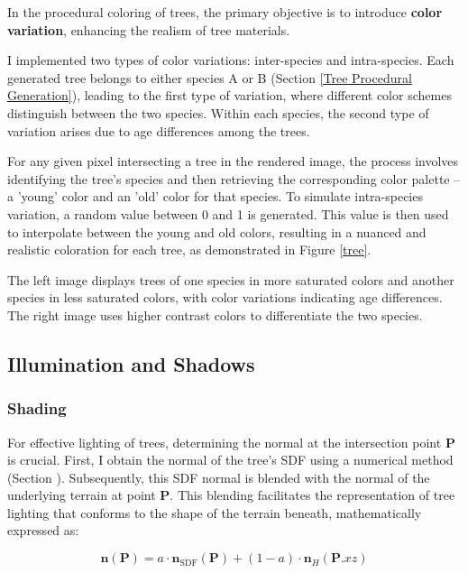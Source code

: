 In the procedural coloring of trees, the primary objective is to introduce \textbf{color variation}, enhancing the realism of tree materials. 

I implemented two types of color variations: inter-species and intra-species. Each generated tree belongs to either species A or B (Section \ref{Tree Procedural Generation}), leading to the first type of variation, where different color schemes distinguish between the two species. Within each species, the second type of variation arises due to age differences among the trees. 

For any given pixel intersecting a tree in the rendered image, the process involves identifying the tree's species and then retrieving the corresponding color palette -- a 'young' color and an 'old' color for that species. To simulate intra-species variation, a random value between 0 and 1 is generated. This value is then used to interpolate between the young and old colors, resulting in a nuanced and realistic coloration for each tree, as demonstrated in Figure \ref{tree}.

{The left image displays trees of one species in more saturated colors and another species in less saturated colors, with color variations indicating age differences. The right image uses higher contrast colors to differentiate the two species.}

\subsection{Illumination and Shadows}

\subsubsection{Shading}

For effective lighting of trees, determining the normal at the intersection point $\mathbf{P}$ is crucial. First, I obtain the normal of the tree's SDF using a numerical method (Section ). Subsequently, this SDF normal is blended with the normal of the underlying terrain at point $\mathbf{P}$. This blending facilitates the representation of tree lighting that conforms to the shape of the terrain beneath, mathematically expressed as:

\begin{equation}
    \mathbf{n}(\mathbf{P}) = a \cdot \mathbf{n}_{\text{SDF}}(\mathbf{P}) + (1 - a) \cdot \mathbf{n}_H(\mathbf{P}.xz)
\end{equation}

